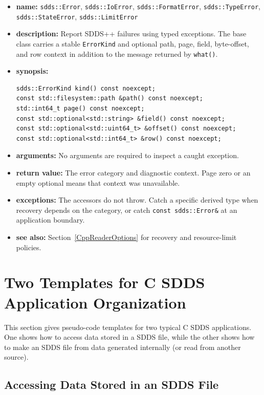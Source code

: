 \documentclass[11pt]{article}
\begin{document}
\begin{itemize}
\item {\bf name:}\newline
{\tt sdds::Error}, {\tt sdds::IoError}, {\tt sdds::FormatError},
{\tt sdds::TypeError}, {\tt sdds::StateError}, {\tt sdds::LimitError}
\item {\bf description:}\newline
Report SDDS++ failures using typed exceptions.  The base class carries a stable
{\tt ErrorKind} and optional path, page, field, byte-offset, and row context in
addition to the message returned by {\tt what()}.
\item {\bf synopsis:}
\begin{verbatim}
sdds::ErrorKind kind() const noexcept;
const std::filesystem::path &path() const noexcept;
std::int64_t page() const noexcept;
const std::optional<std::string> &field() const noexcept;
const std::optional<std::uint64_t> &offset() const noexcept;
const std::optional<std::int64_t> &row() const noexcept;
\end{verbatim}
\item {\bf arguments:}\newline
No arguments are required to inspect a caught exception.
\item {\bf return value:}\newline
The error category and diagnostic context.  Page zero or an empty optional
means that context was unavailable.
\item {\bf exceptions:}\newline
The accessors do not throw.  Catch a specific derived type when recovery depends
on the category, or catch {\tt const sdds::Error\&} at an application boundary.
\item {\bf see also:}\newline
Section~\ref{CppReaderOptions} for recovery and resource-limit policies.
\end{itemize}

\section{Two Templates for C SDDS Application Organization}
This section gives pseudo-code templates for two typical C SDDS applications. One shows how to access data stored in a SDDS file, while the other shows how to make an SDDS file from data generated internally (or read from another source).
\subsection{Accessing Data Stored in an SDDS File}
\end{document}
